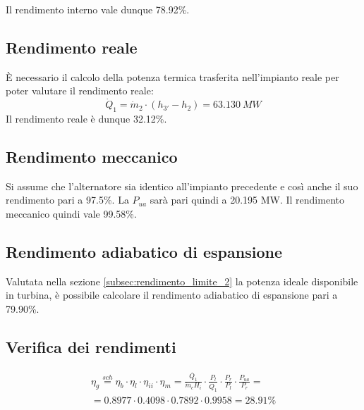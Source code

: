 Il rendimento interno vale dunque 78.92\%.

\subsection{Rendimento reale}
È necessario il calcolo della potenza termica trasferita nell'impianto reale per poter valutare il rendimento reale:
\begin{equation*}
    \dot Q_1 = \dot m_2 \cdot (h_{3'} - h_2) = 63.130\ MW
\end{equation*}
Il rendimento reale è dunque 32.12\%.

\subsection{Rendimento meccanico}
Si assume che l'alternatore sia identico all'impianto precedente e così anche il suo rendimento pari a 97.5\%.
La $P_{ua}$ sarà pari quindi a 20.195 MW. Il rendimento meccanico quindi vale 99.58\%.

\subsection{Rendimento adiabatico di espansione}
Valutata nella sezione \ref{subsec:rendimento_limite_2} la potenza ideale disponibile in turbina, è possibile calcolare il rendimento adiabatico di espansione pari a
79.90\%.

\subsection{Verifica dei rendimenti}
\begin{align*}
    \eta_g \stackrel{sch}{=} \eta_b \cdot \eta_l \cdot \eta_{ii} \cdot \eta_m
    = \frac{\dot{Q_1}}{\dot{m}_c H_i}\cdot \frac{P_l}{\dot{Q_1}} \cdot \frac{P_r}{P_l}\cdot \frac{P_{ua}}{P_r} = \\
    =  0.8977 \cdot 0.4098 \cdot 0.7892 \cdot 0.9958 = 28.91 \%
\end{align*}
